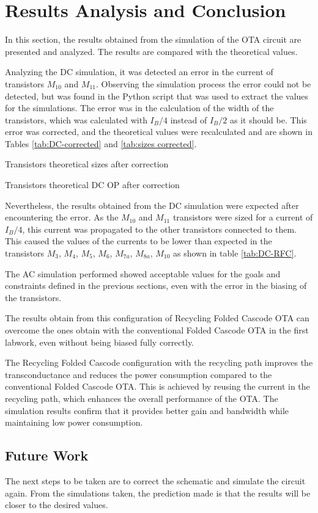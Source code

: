 \section{Results Analysis and Conclusion}

In this section, the results obtained from the simulation of the OTA circuit are presented and analyzed. The results are compared with the theoretical values.

Analyzing the DC simulation, it was detected an error in the current of transistors $M_{10}$ and $M_{11}$. Observing the simulation process the error could not be detected, but was found in the Python script that was used to extract the values for the simulations. The error was in the calculation of the width of the transistors, which was calculated with $I_B/4$ instead of $I_B/2$ as it should be. This error was corrected, and the theoretical values were recalculated and are shown in Tables \ref{tab:DC-corrected} and \ref{tab:sizes corrected}.

\begin{table}[H]
    \centering
    \caption{Transistors theoretical sizes after correction}
    \label{tab:sizes corrected}
\end{table}

\begin{table}[H]
    \centering
    \caption{Transistors theoretical DC OP after correction}
    \label{tab:DC-corrected}
\end{table}

Nevertheless, the results obtained from the DC simulation were expected after encountering the error. As the $M_{10}$ and $M_{11}$ transistors were sized for a current of $I_B/4$, this current was propagated to the other transistors connected to them. This caused the values of the currents to be lower than expected in the transistors $M_3$, $M_4$, $M_5$, $M_6$, $M_{7a}$, $M_{8a}$, $M_{10}$ as shown in table \ref{tab:DC-RFC}.

The AC simulation performed showed acceptable values for the goals and constraints defined in the previous sections, even with the error in the biasing of the transistors.

The results obtain from this configuration of Recycling Folded Cascode OTA can overcome the ones obtain with the conventional Folded Cascode OTA in the first labwork, even without being biased fully correctly.

The Recycling Folded Cascode configuration with the recycling path improves the transconductance and reduces the power consumption compared to the conventional Folded Cascode OTA. This is achieved by reusing the current in the recycling path, which enhances the overall performance of the OTA. The simulation results confirm that it provides better gain and bandwidth while maintaining low power consumption.

\subsection{Future Work}

The next steps to be taken are to correct the schematic and simulate the circuit again. From the simulations taken, the prediction made is that the results will be closer to the desired values. 